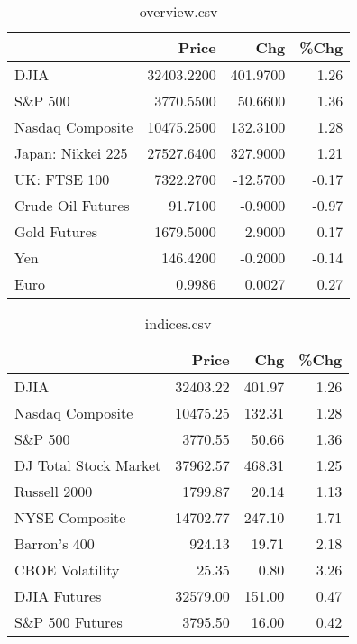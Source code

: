 \documentclass{article}%
\begin{document}
\begin{table}[htbp]%
\caption{overview.csv}%
\centering%
\begin{adjustbox}{width=1\textwidth}%
\begin{tabular}{lrrr}
\toprule
                  &      Price &      Chg &  \%Chg \\
\midrule
             DJIA & 32403.2200 & 401.9700 &  1.26 \\
          S\&P 500 &  3770.5500 &  50.6600 &  1.36 \\
 Nasdaq Composite & 10475.2500 & 132.3100 &  1.28 \\
Japan: Nikkei 225 & 27527.6400 & 327.9000 &  1.21 \\
     UK: FTSE 100 &  7322.2700 & -12.5700 & -0.17 \\
Crude Oil Futures &    91.7100 &  -0.9000 & -0.97 \\
     Gold Futures &  1679.5000 &   2.9000 &  0.17 \\
              Yen &   146.4200 &  -0.2000 & -0.14 \\
             Euro &     0.9986 &   0.0027 &  0.27 \\
\bottomrule
\end{tabular}
%
\end{adjustbox}%
\end{table}

%


\begin{table}[htbp]%
\caption{indices.csv}%
\centering%
\begin{adjustbox}{width=1\textwidth}%
\begin{tabular}{lrrr}
\toprule
                      &    Price &    Chg &  \%Chg \\
\midrule
                 DJIA & 32403.22 & 401.97 &  1.26 \\
     Nasdaq Composite & 10475.25 & 132.31 &  1.28 \\
              S\&P 500 &  3770.55 &  50.66 &  1.36 \\
DJ Total Stock Market & 37962.57 & 468.31 &  1.25 \\
         Russell 2000 &  1799.87 &  20.14 &  1.13 \\
       NYSE Composite & 14702.77 & 247.10 &  1.71 \\
         Barron's 400 &   924.13 &  19.71 &  2.18 \\
      CBOE Volatility &    25.35 &   0.80 &  3.26 \\
         DJIA Futures & 32579.00 & 151.00 &  0.47 \\
      S\&P 500 Futures &  3795.50 &  16.00 &  0.42 \\
\bottomrule
\end{tabular}
%
\end{adjustbox}%
\end{table}
\end{document}
